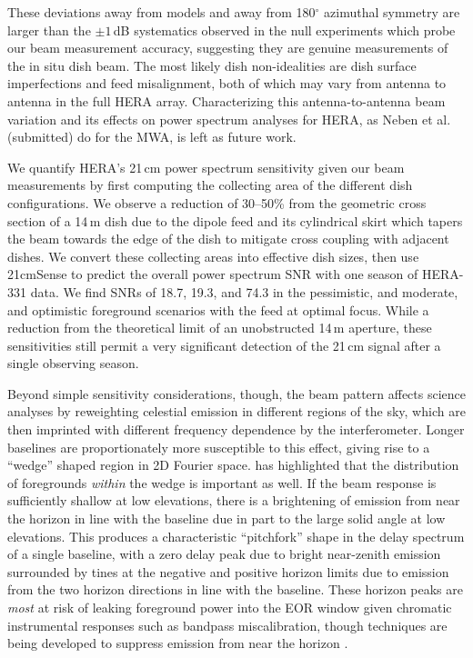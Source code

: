 \documentclass{emulateapj}
\begin{document}
These deviations away from models and away from 180$^\circ$ azimuthal symmetry are larger than the $\pm1$\,dB systematics observed in the null experiments which probe our beam measurement accuracy, suggesting they are genuine measurements of the in situ dish beam. The most likely dish non-idealities are dish surface imperfections and feed misalignment, both of which may vary from antenna to antenna in the full HERA array. Characterizing this antenna-to-antenna beam variation and its effects on power spectrum analyses for HERA, as Neben et al. (submitted) do for the MWA, is left as future work.

We quantify HERA's 21\,cm power spectrum sensitivity given our beam measurements by first computing the collecting area of the different dish configurations. We observe a reduction of 30--50\% from the geometric cross section of a 14\,m dish due to the dipole feed and its cylindrical skirt which tapers the beam towards the edge of the dish to mitigate cross coupling with adjacent dishes. We convert these collecting areas into effective dish sizes, then use 21cmSense to predict the overall power spectrum SNR with one season of HERA-331 data. We find SNRs of 18.7, 19.3, and 74.3 in the pessimistic, and moderate, and optimistic foreground scenarios with the feed at optimal focus. While a reduction from the theoretical limit of an unobstructed 14\,m aperture, these sensitivities still permit a very significant detection of the 21\,cm signal after a single observing season.

Beyond simple sensitivity considerations, though, the beam pattern affects science analyses by reweighting celestial emission in different regions of the sky, which are then imprinted with different frequency dependence by the interferometer. Longer baselines are proportionately more susceptible to this effect, giving rise to a ``wedge'' shaped region in 2D Fourier space. \citet{nithya15} has highlighted that the distribution of foregrounds \textit{within} the wedge is important as well. If the beam response is sufficiently shallow at low elevations, there is a brightening of emission from near the horizon in line with the baseline due in part to the large solid angle at low elevations. This produces a characteristic ``pitchfork'' shape in the delay spectrum of a single baseline, with a zero delay peak due to bright near-zenith emission surrounded by tines at the negative and positive horizon limits due to emission from the two horizon directions in line with the baseline. These horizon peaks are \textit{most} at risk of leaking foreground power into the EOR window given chromatic instrumental responses such as bandpass miscalibration, though techniques are being developed to suppress emission from near the horizon \citep{parsonsoptimalfringeratefiltering}.
\end{document}
